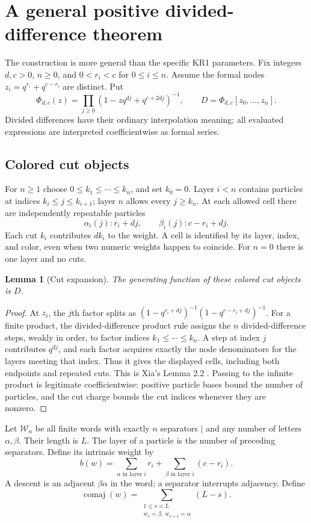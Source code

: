 \documentclass[11pt,a4paper]{article}
\newtheorem{lemma}[theorem]{Lemma}
\theoremstyle{definition}
\newcommand{\cm}{\operatorname{comaj}}
\begin{document}
\section{A general positive divided-difference theorem}\label{sec:main}

The construction is more general than the specific KR1 parameters.
Fix integers $d,c>0$, $n\ge0$, and $0<r_i<c$ for $0\le i\le n$.
Assume the formal nodes $z_i=q^{r_i}+q^{c-r_i}$ are distinct. Put
\[
\Phi_{d,c}(z)=\prod_{j\ge0}(1-zq^{dj}+q^{c+2dj})^{-1},
\qquad D=\Phi_{d,c}[z_0,\ldots,z_n].
\]
Divided differences have their ordinary interpolation meaning; all evaluated
expressions are interpreted coefficientwise as formal series.

\subsection{Colored cut objects}

For $n\ge1$ choose $0\le k_1\le\cdots\le k_n$, and set $k_0=0$.
Layer $i<n$ contains particles at indices
$k_i\le j\le k_{i+1}$; layer $n$ allows every $j\ge k_n$.
At each allowed cell there are independently repeatable particles
\[
\alpha_i(j): r_i+dj,\qquad \beta_i(j): c-r_i+dj.
\]
Each cut $k_i$ contributes $dk_i$ to the weight. A cell is identified by
its layer, index, and color, even when two numeric weights happen to coincide.
For $n=0$ there is one layer and no cuts.

\begin{lemma}[Cut expansion]\label{lem:cut}
The generating function of these colored cut objects is $D$.
\end{lemma}
\begin{proof}
At $z_i$, the $j$th factor splits as
$(1-q^{r_i+dj})^{-1}(1-q^{c-r_i+dj})^{-1}$.
For a finite product, the divided-difference product rule assigns the $n$
divided-difference steps, weakly in order, to factor indices
$k_1\le\cdots\le k_n$. A step at index $j$ contributes $q^{dj}$,
and each factor acquires exactly the node denominators for the layers
meeting that index. Thus it gives the displayed cells, including both endpoints
and repeated cuts. This is Xia's Lemma 2.2 \cite{xia}.
Passing to the infinite product is legitimate coefficientwise: positive
particle bases bound the number of particles, and the cut charge bounds the
cut indices whenever they are nonzero.
\end{proof}

Let $\mathcal W_n$ be all finite words with exactly $n$ separators $\mid$
and any number of letters $\alpha,\beta$. Their length is $L$.
The layer of a particle is the number of preceding separators.
Define its intrinsic weight by
\[
b(w)=\sum_{\alpha\text{ in layer }i}r_i+
      \sum_{\beta\text{ in layer }i}(c-r_i).
\]
A descent is an adjacent $\beta\alpha$ in the word; a separator interrupts
adjacency. Define
\[
\cm(w)=\sum_{\substack{1\le s<L\\w_s=\beta,\ w_{s+1}=\alpha}}(L-s).
\]
\end{document}
